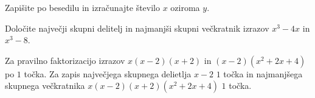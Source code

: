 \documentclass[addpoints]{exam}
\begin{document}
\begin{questions}

    
    
    \question
    Zapišite po besedilu in izračunajte število $x$ oziroma $y$.




    \question[4]
    Določite največji skupni delitelj in najmanjši skupni večkratnik izrazov $x^3-4x$ in $x^3-8$.

    \begin{solution}[4cm]
        Za pravilno faktorizacijo izrazov $x(x-2)(x+2)$ in $(x-2)(x^2+2x+4)$ po $1$ točka. 
        Za zapis največjega skupnega delietlja $x-2$ $1$ točka in najmanjšega skupnega večkratnika $x(x-2)(x+2)(x^2+2x+4)$ $1$ točka.
    \end{solution}
    




     \newpage

    

\end{questions}
\end{document}
